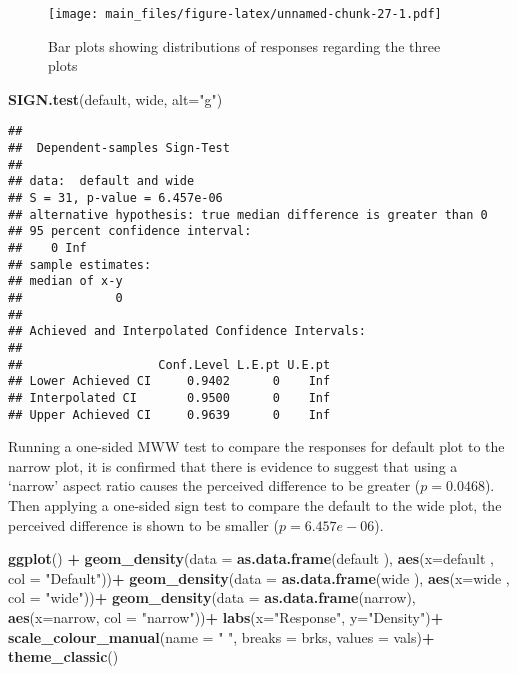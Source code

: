 \documentclass[
]{article}
\newenvironment{Shaded}{\begin{snugshade}}{\end{snugshade}}
\newcommand{\DataTypeTok}[1]{\textcolor[rgb]{0.13,0.29,0.53}{#1}}
\newcommand{\KeywordTok}[1]{\textcolor[rgb]{0.13,0.29,0.53}{\textbf{#1}}}
\newcommand{\NormalTok}[1]{#1}
\newcommand{\OperatorTok}[1]{\textcolor[rgb]{0.81,0.36,0.00}{\textbf{#1}}}
\newcommand{\StringTok}[1]{\textcolor[rgb]{0.31,0.60,0.02}{#1}}
\begin{document}
\begin{figure}
\centering
\texttt{[image: main\_files/figure-latex/unnamed-chunk-27-1.pdf]}
\caption{Bar plots showing distributions of responses regarding the
three plots}
\end{figure}

\begin{Shaded}
\begin{Highlighting}[]
\KeywordTok{SIGN.test}\NormalTok{(default, wide, }\DataTypeTok{alt=}\StringTok{"g"}\NormalTok{)}
\end{Highlighting}
\end{Shaded}

\begin{verbatim}
## 
##  Dependent-samples Sign-Test
## 
## data:  default and wide
## S = 31, p-value = 6.457e-06
## alternative hypothesis: true median difference is greater than 0
## 95 percent confidence interval:
##    0 Inf
## sample estimates:
## median of x-y 
##             0 
## 
## Achieved and Interpolated Confidence Intervals: 
## 
##                   Conf.Level L.E.pt U.E.pt
## Lower Achieved CI     0.9402      0    Inf
## Interpolated CI       0.9500      0    Inf
## Upper Achieved CI     0.9639      0    Inf
\end{verbatim}

Running a one-sided MWW test to compare the responses for default plot
to the narrow plot, it is confirmed that there is evidence to suggest
that using a `narrow' aspect ratio causes the perceived difference to be
greater (\(p=0.0468\)). Then applying a one-sided sign test to compare
the default to the wide plot, the perceived difference is shown to be
smaller (\(p=6.457e-06\)).

\begin{Shaded}
\begin{Highlighting}[]
\KeywordTok{ggplot}\NormalTok{() }\OperatorTok{+}
\StringTok{  }\KeywordTok{geom_density}\NormalTok{(}\DataTypeTok{data =} \KeywordTok{as.data.frame}\NormalTok{(default ), }\KeywordTok{aes}\NormalTok{(}\DataTypeTok{x=}\NormalTok{default , }\DataTypeTok{col =} \StringTok{"Default"}\NormalTok{))}\OperatorTok{+}
\StringTok{  }\KeywordTok{geom_density}\NormalTok{(}\DataTypeTok{data =} \KeywordTok{as.data.frame}\NormalTok{(wide   ), }\KeywordTok{aes}\NormalTok{(}\DataTypeTok{x=}\NormalTok{wide   , }\DataTypeTok{col =} \StringTok{"wide"}\NormalTok{))}\OperatorTok{+}
\StringTok{  }\KeywordTok{geom_density}\NormalTok{(}\DataTypeTok{data =} \KeywordTok{as.data.frame}\NormalTok{(narrow), }\KeywordTok{aes}\NormalTok{(}\DataTypeTok{x=}\NormalTok{narrow, }\DataTypeTok{col =} \StringTok{"narrow"}\NormalTok{))}\OperatorTok{+}
\StringTok{  }\KeywordTok{labs}\NormalTok{(}\DataTypeTok{x=}\StringTok{"Response"}\NormalTok{, }\DataTypeTok{y=}\StringTok{"Density"}\NormalTok{)}\OperatorTok{+}
\StringTok{  }\KeywordTok{scale_colour_manual}\NormalTok{(}\DataTypeTok{name =} \StringTok{" "}\NormalTok{, }\DataTypeTok{breaks =}\NormalTok{ brks, }\DataTypeTok{values =}\NormalTok{ vals)}\OperatorTok{+}
\StringTok{  }\KeywordTok{theme_classic}\NormalTok{()}
\end{Highlighting}
\end{Shaded}
\end{document}
